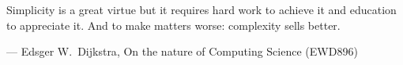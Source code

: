 \thispagestyle{empty}
\vspace*{\fill}
\setlength\epigraphwidth{8cm}
\setlength\epigraphrule{0pt}
\epigraphfontsize{\itshape}
\epigraph{Simplicity is a great virtue but it requires hard work to achieve it and education to appreciate it. And to make matters worse: complexity sells better.}{--- \textup{Edsger W.\ Dijkstra}, On the nature of Computing Science (EWD896)}
\vspace*{\fill}